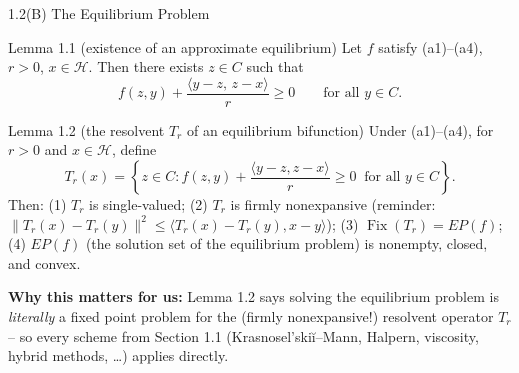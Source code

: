 \documentclass[aspectratio=169,10pt]{beamer}
\newcommand{\Hil}{\mathcal{H}}
\newcommand{\Fix}{\operatorname{Fix}}
\begin{document}
\begin{frame}[allowframebreaks]{1.2(B) The Equilibrium Problem}
\framebreak

\begin{block}{Lemma 1.1 (existence of an approximate equilibrium)}
Let $f$ satisfy (a1)--(a4), $r>0$, $x\in\Hil$. Then there exists $z\in C$
such that
\[
  f(z,y) + \frac{\langle y-z,\,z-x\rangle}{r} \ge 0 \qquad \text{for all } y\in C.
\]
\end{block}

\begin{block}{Lemma 1.2 (the resolvent $T_r$ of an equilibrium bifunction)}
Under (a1)--(a4), for $r>0$ and $x\in\Hil$, define
\[
  T_r(x) = \left\{z\in C: f(z,y)+\frac{\langle y-z,z-x\rangle}{r}\ge 0
  \ \text{ for all } y\in C\right\}.
\]
Then: (1) $T_r$ is single-valued; (2) $T_r$ is firmly nonexpansive
(reminder: $\|T_r(x)-T_r(y)\|^2\le\langle T_r(x)-T_r(y),x-y\rangle$); (3)
$\Fix(T_r)=EP(f)$; (4) $EP(f)$ (the solution set of the equilibrium
problem) is nonempty, closed, and convex.
\end{block}

\framebreak

\textbf{Why this matters for us:} Lemma 1.2 says solving the equilibrium
problem is \emph{literally} a fixed point problem for the (firmly
nonexpansive!) resolvent operator $T_r$ -- so every scheme from Section
1.1 (Krasnosel'ski\u{i}--Mann, Halpern, viscosity, hybrid methods, \dots)
applies directly.

\end{frame}
\end{document}
